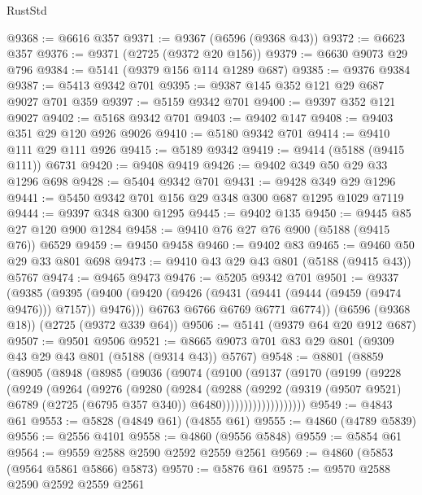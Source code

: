 \begin{lexlean}{RustStd}
\begin{coremodule}
@9368 := @6616 @357
@9371 := @9367 (@6596 (@9368 @43))
@9372 := @6623 @357
@9376 := @9371 (@2725 (@9372 @20 @156))
@9379 := @6630 @9073 @29 @796
@9384 := @5141 (@9379 @156 @114 @1289 @687)
@9385 := @9376 @9384
@9387 := @5413 @9342 @701
@9395 := @9387 @145 @352 @121 @29 @687 @9027 @701 @359
@9397 := @5159 @9342 @701
@9400 := @9397 @352 @121 @9027
@9402 := @5168 @9342 @701
@9403 := @9402 @147
@9408 := @9403 @351 @29 @120 @926 @9026
@9410 := @5180 @9342 @701
@9414 := @9410 @111 @29 @111 @926
@9415 := @5189 @9342
@9419 := @9414 (@5188 (@9415 @111)) @6731
@9420 := @9408 @9419
@9426 := @9402 @349 @50 @29 @33 @1296 @698
@9428 := @5404 @9342 @701
@9431 := @9428 @349 @29 @1296
@9441 := @5450 @9342 @701 @156 @29 @348 @300 @687 @1295 @1029 @7119
@9444 := @9397 @348 @300 @1295
@9445 := @9402 @135
@9450 := @9445 @85 @27 @120 @900 @1284
@9458 := @9410 @76 @27 @76 @900 (@5188 (@9415 @76)) @6529
@9459 := @9450 @9458
@9460 := @9402 @83
@9465 := @9460 @50 @29 @33 @801 @698
@9473 := @9410 @43 @29 @43 @801 (@5188 (@9415 @43)) @5767
@9474 := @9465 @9473
@9476 := @5205 @9342 @701
@9501 := @9337
    (@9385
      (@9395
        (@9400 (@9420 (@9426 (@9431 (@9441 (@9444 (@9459 (@9474 @9476))) @7157)) @9476)))
        @6763
        @6766
        @6769
        @6771
        @6774))
    (@6596 (@9368 @18))
    (@2725 (@9372 @339 @64))
@9506 := @5141 (@9379 @64 @20 @912 @687)
@9507 := @9501 @9506
@9521 := @8665 @9073 @701 @83 @29 @801 (@9309 @43 @29 @43 @801 (@5188 (@9314 @43)) @5767)
@9548 := @8801
    (@8859
      (@8905
        (@8948
          (@8985
            (@9036
              (@9074
                (@9100
                  (@9137
                    (@9170
                      (@9199
                        (@9228
                          (@9249
                            (@9264
                              (@9276
                                (@9280
                                  (@9284
                                    (@9288
                                      (@9292
                                        (@9319
                                          (@9507 @9521)
                                          @6789
                                          (@2725 (@6795 @357 @340))
                                          @6480)))))))))))))))))))
@9549 := @4843 @61
@9553 := @5828 (@4849 @61) (@4855 @61)
@9555 := @4860 (@4789 @5839)
@9556 := @2556 @4101
@9558 := @4860 (@9556 @5848)
@9559 := @5854 @61
@9564 := @9559 @2588 @2590 @2592 @2559 @2561
@9569 := @4860 (@5853 (@9564 @5861 @5866) @5873)
@9570 := @5876 @61
@9575 := @9570 @2588 @2590 @2592 @2559 @2561

\end{coremodule}
\end{lexlean}
